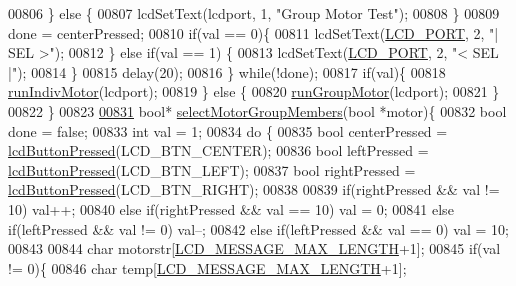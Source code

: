 \begin{DoxyCode}
{{{{{{{{{{{{00806         \} \textcolor{keywordflow}{else} \{
00807             lcdSetText(lcdport, 1, \textcolor{stringliteral}{"Group Motor Test"});
00808         \}
00809         done = centerPressed;
00810         \textcolor{keywordflow}{if}(val == 0)\{
00811             lcdSetText(\hyperlink{lcdmsg_8h_abcf42bd88b3c36193f301ca25b033875}{LCD\_PORT}, 2, \textcolor{stringliteral}{"|      SEL     >"});
00812         \} \textcolor{keywordflow}{else} \textcolor{keywordflow}{if}(val == 1) \{
00813             lcdSetText(\hyperlink{lcdmsg_8h_abcf42bd88b3c36193f301ca25b033875}{LCD\_PORT}, 2, \textcolor{stringliteral}{"<      SEL     |"});
00814         \}
00815         delay(20);
00816     \} \textcolor{keywordflow}{while}(!done);
00817     \textcolor{keywordflow}{if}(val)\{
00818         \hyperlink{lcddiag_8c_ad4df85d8b386f9a60b097fd65cf27e3b}{runIndivMotor}(lcdport);
00819     \} \textcolor{keywordflow}{else} \{
00820         \hyperlink{lcddiag_8c_a61bf99fda231c065d2113f0c67b8d72a}{runGroupMotor}(lcdport);
00821     \}
00822 \}
00823 
\hypertarget{lcddiag_8c_source.tex_l00831}{}\hyperlink{lcddiag_8c_a72f3f96c95c24f67103b2eb30995dccb}{00831} \textcolor{keywordtype}{bool}* \hyperlink{lcddiag_8c_a72f3f96c95c24f67103b2eb30995dccb}{selectMotorGroupMembers}(\textcolor{keywordtype}{bool} *motor)\{
00832     \textcolor{keywordtype}{bool} done = \textcolor{keyword}{false};
00833     \textcolor{keywordtype}{int} val = 1;
00834     \textcolor{keywordflow}{do} \{
00835         \textcolor{keywordtype}{bool} centerPressed = \hyperlink{lcddiag_8h_a74e4c744db49f9b7b645095575e152ad}{lcdButtonPressed}(LCD\_BTN\_CENTER);
00836         \textcolor{keywordtype}{bool} leftPressed = \hyperlink{lcddiag_8h_a74e4c744db49f9b7b645095575e152ad}{lcdButtonPressed}(LCD\_BTN\_LEFT);
00837         \textcolor{keywordtype}{bool} rightPressed = \hyperlink{lcddiag_8h_a74e4c744db49f9b7b645095575e152ad}{lcdButtonPressed}(LCD\_BTN\_RIGHT);
00838 
00839         \textcolor{keywordflow}{if}(rightPressed && val != 10) val++;
00840         \textcolor{keywordflow}{else} \textcolor{keywordflow}{if}(rightPressed && val == 10) val = 0;
00841         \textcolor{keywordflow}{else} \textcolor{keywordflow}{if}(leftPressed && val != 0) val--;
00842         \textcolor{keywordflow}{else} \textcolor{keywordflow}{if}(leftPressed && val == 0) val = 10;
00843 
00844         \textcolor{keywordtype}{char} motorstr[\hyperlink{lcdmsg_8h_abe4c4b70fc6f44ae3680e5b2c68cdd00}{LCD\_MESSAGE\_MAX\_LENGTH}+1];
00845         \textcolor{keywordflow}{if}(val != 0)\{
00846             \textcolor{keywordtype}{char} temp[\hyperlink{lcdmsg_8h_abe4c4b70fc6f44ae3680e5b2c68cdd00}{LCD\_MESSAGE\_MAX\_LENGTH}+1];
}}}}}}}}}}}}
\end{DoxyCode}
